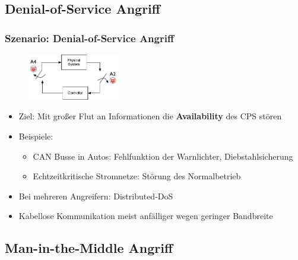 \documentclass{sikslides}
\begin{document}
    \subsection{Denial-of-Service Angriff}
    \begin{frame}
        \frametitle{Szenario: Denial-of-Service Angriff}
        \begin{figure}
            \centering
            \includegraphics[width=4cm]{figure/dos}
        \end{figure}
        \begin{itemize}
            \item Ziel: Mit großer Flut an Informationen die \textbf{Availability} des CPS stören
            \pause
            \item Beispiele:
            \begin{itemize}
                \item CAN Busse in Autos: Fehlfunktion der Warnlichter, Diebstahlsicherung
                \item Echtzeitkritische Stromnetze: Störung des Normalbetrieb
            \end{itemize}
            \pause
            \item Bei mehreren Angreifern: Distributed-DoS
            \item Kabellose Kommunikation meist anfälliger wegen geringer Bandbreite
        \end{itemize}
    \end{frame}

    \subsection{Man-in-the-Middle Angriff}
\end{document}
